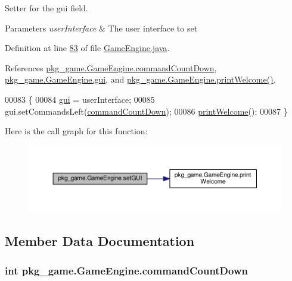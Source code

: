 Setter for the gui field. 


\begin{DoxyParams}{Parameters}
{\em user\-Interface} & The user interface to set \\
\hline
\end{DoxyParams}


Definition at line \hyperlink{GameEngine_8java_source_l00083}{83} of file \hyperlink{GameEngine_8java_source}{Game\-Engine.\-java}.



References \hyperlink{GameEngine_8java_source_l00065}{pkg\-\_\-game.\-Game\-Engine.\-command\-Count\-Down}, \hyperlink{GameEngine_8java_source_l00051}{pkg\-\_\-game.\-Game\-Engine.\-gui}, and \hyperlink{GameEngine_8java_source_l00092}{pkg\-\_\-game.\-Game\-Engine.\-print\-Welcome()}.


\begin{DoxyCode}
00083                                                     \{
00084         \hyperlink{classpkg__game_1_1GameEngine_a152cd31474cc8a5980e32c2cab6e7d36}{gui} = userInterface;
00085         gui.setCommandsLeft(\hyperlink{classpkg__game_1_1GameEngine_af4ea44f51563b4e2c0a67fe918bf5e3c}{commandCountDown});
00086         \hyperlink{classpkg__game_1_1GameEngine_ab0ff9bb9fc35230d82b7e47bf55e40fd}{printWelcome}();
00087     \}
\end{DoxyCode}


Here is the call graph for this function\-:
\nopagebreak
\begin{figure}[H]
\begin{center}
\leavevmode
\includegraphics[width=350pt]{classpkg__game_1_1GameEngine_a0156eb9ee85fc086aef4da8594fb2891_cgraph}
\end{center}
\end{figure}




\subsection{Member Data Documentation}
\hypertarget{classpkg__game_1_1GameEngine_af4ea44f51563b4e2c0a67fe918bf5e3c}{
\subsubsection[{command\-Count\-Down}]{\setlength{\rightskip}{0pt plus 5cm}int pkg\-\_\-game.\-Game\-Engine.\-command\-Count\-Down\hspace{0.3cm}{\ttfamily [private]}}}\label{classpkg__game_1_1GameEngine_af4ea44f51563b4e2c0a67fe918bf5e3c}


